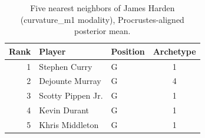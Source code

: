 \begin{table}[htbp]
  \centering\small
  \begin{tabular}{rllc}
    \toprule
    Rank & Player & Position & Archetype \\
    \midrule
    1 & Stephen Curry & G & 1 \\
    2 & Dejounte Murray & G & 4 \\
    3 & Scotty Pippen Jr. & G & 1 \\
    4 & Kevin Durant & G & 1 \\
    5 & Khris Middleton & G & 1 \\
    \bottomrule
  \end{tabular}
  \caption{Five nearest neighbors of James Harden (curvature_m1 modality), Procrustes-aligned posterior mean.}
  \label{tab:James_Harden_neighbors_curvature_m1}
\end{table}

